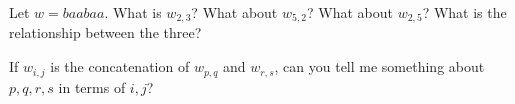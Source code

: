   \begin{tightlist}
    \item
      Let $w = baabaa$. What is $w_{2,3}$? What about $w_{5,2}$?
      What about $w_{2,5}$?
      What is the relationship between the three?
    \item
      If $w_{i,j}$ is the concatenation of $w_{p,q}$ and $w_{r,s}$,
      can you tell me something about $p,q,r,s$ in terms of $i,j$?
    \end{tightlist}
